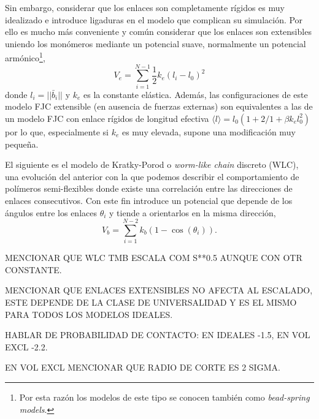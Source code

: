 Sin embargo, considerar que los enlaces son completamente rígidos es muy idealizado e introduce ligaduras en el modelo que complican su simulación. Por ello es mucho más conveniente y común considerar que los enlaces son extensibles uniendo los monómeros mediante un potencial suave, normalmente un potencial armónico\footnote{Por esta razón los modelos de este tipo se conocen también como \textit{bead-spring models}.},
\begin{equation}
    \label{eq:Harmonic_Potential}
    V_e=\sum_{i=1}^{N-1}\frac{1}{2}k_e(l_i-l_0)^2
\end{equation}
donde $l_i=||\bar{b}_i||$ y $k_e$ es la constante elástica. Además, las configuraciones de este modelo FJC extensible \cite{Fiasconaro2019} (en ausencia de fuerzas externas) son equivalentes a las de un modelo FJC con enlace rígidos de longitud efectiva $\langle l \rangle=l_0(1+2/1+\beta k_e l_0^2)$ por lo que, especialmente si $k_e$ es muy elevada, supone una modificación muy pequeña.

El siguiente es el modelo de Kratky-Porod o \textit{worm-like chain} discreto (WLC), una evolución del anterior con la que podemos describir el comportamiento de polímeros semi-flexibles donde existe una correlación entre las direcciones de enlaces consecutivos. Con este fin introduce un potencial que depende de los ángulos entre los enlaces $\theta_i$ y tiende a orientarlos en la misma dirección,
\begin{equation}
    \label{eq:Bending_Potential}
    V_b=\sum_{i=1}^{N-2} k_b (1-\cos(\theta_i)).
\end{equation}

MENCIONAR QUE WLC TMB ESCALA COM S**0.5 AUNQUE CON OTR CONSTANTE.

MENCIONAR QUE ENLACES EXTENSIBLES NO AFECTA AL ESCALADO, ESTE DEPENDE DE LA CLASE DE UNIVERSALIDAD Y ES EL MISMO PARA TODOS LOS MODELOS IDEALES.

HABLAR DE PROBABILIDAD DE CONTACTO: EN IDEALES -1.5, EN VOL EXCL -2.2.

EN VOL EXCL MENCIONAR QUE RADIO DE CORTE ES 2 SIGMA.
